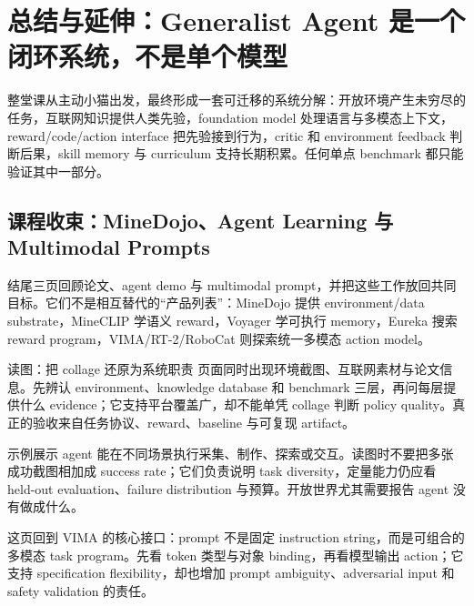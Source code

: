 \section{总结与延伸：Generalist Agent 是一个闭环系统，不是单个模型}

整堂课从主动小猫出发，最终形成一套可迁移的系统分解：开放环境产生未穷尽的任务，互联网知识提供人类先验，foundation model 处理语言与多模态上下文，reward/code/action interface 把先验接到行为，critic 和 environment feedback 判断后果，skill memory 与 curriculum 支持长期积累。任何单点 benchmark 都只能验证其中一部分。

\subsection{课程收束：MineDojo、Agent Learning 与 Multimodal Prompts}

结尾三页回顾论文、agent demo 与 multimodal prompt，并把这些工作放回共同目标。它们不是相互替代的“产品列表”：MineDojo 提供 environment/data substrate，MineCLIP 学语义 reward，Voyager 学可执行 memory，Eureka 搜索 reward program，VIMA/RT-2/RoboCat 则探索统一多模态 action model。


\begin{knowledgebox}{读图：把 collage 还原为系统职责}
页面同时出现环境截图、互联网素材与论文信息。先辨认 environment、knowledge database 和 benchmark 三层，再问每层提供什么 evidence；它支持平台覆盖广，却不能单凭 collage 判断 policy quality。真正的验收来自任务协议、reward、baseline 与可复现 artifact。
\end{knowledgebox}


示例展示 agent 能在不同场景执行采集、制作、探索或交互。读图时不要把多张成功截图相加成 success rate；它们负责说明 task diversity，定量能力仍应看 held-out evaluation、failure distribution 与预算。开放世界尤其需要报告 agent 没有做成什么。


这页回到 VIMA 的核心接口：prompt 不是固定 instruction string，而是可组合的多模态 task program。先看 token 类型与对象 binding，再看模型输出 action；它支持 specification flexibility，却也增加 prompt ambiguity、adversarial input 和 safety validation 的责任。

